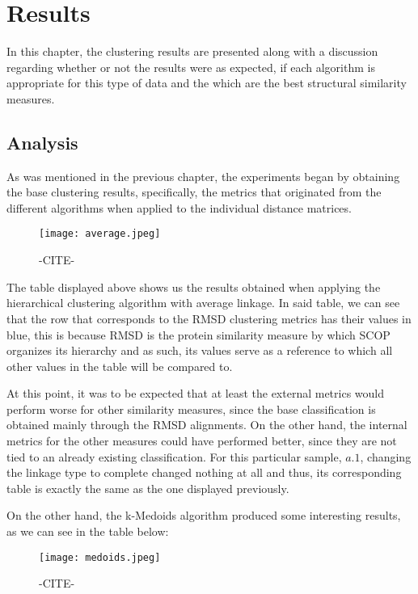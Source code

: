\chapter{Results}

In this chapter, the clustering results are presented along with a discussion regarding whether or not the results were as expected, if each algorithm is appropriate for this type of data and the which are the best structural similarity measures.

\section{Analysis}

As was mentioned in the previous chapter, the experiments began by obtaining the base clustering results, specifically, the metrics that originated from the different algorithms when applied to the individual distance matrices.

\begin{figure}[htbp]
	\centering
	\texttt{[image: average.jpeg]}
	\caption{-CITE-}
	\label{}
\end{figure}

The table displayed above shows us the results obtained when applying the hierarchical clustering algorithm with average linkage. In said table, we can see that the row that corresponds to the RMSD clustering metrics has their values in blue, this is because RMSD is the protein similarity measure by which SCOP organizes its hierarchy and as such, its values serve as a reference to which all other values in the table will be compared to. 

At this point, it was to be expected that at least the external metrics would perform worse for other similarity measures, since the base classification is obtained mainly through the RMSD alignments. On the other hand, the internal metrics for the other measures could have performed better, since they are not tied to an already existing classification. For this particular sample, $a.1$, changing the linkage type to complete changed nothing at all and thus, its corresponding table is exactly the same as the one displayed previously.

On the other hand, the k-Medoids algorithm produced some interesting results, as we can see in the table below:

\begin{figure}[htbp]
	\centering
	\texttt{[image: medoids.jpeg]}
	\caption{-CITE-}
	\label{}
\end{figure}

